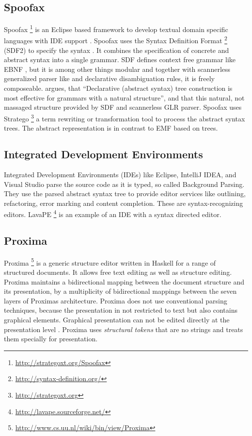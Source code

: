 \subsection{Spoofax}
Spoofax \footnote{\raggedright \url{http://strategoxt.org/Spoofax}} is an Eclipse based framework to develop textual domain specific languages with IDE support \cite{Spoofax}. Spoofax uses the Syntax Definition Format \footnote{\raggedright \url{http://syntax-definition.org/}} (SDF2) to specify the syntax \cite{Spoofax}. It combines the specification of concrete and abstract syntax into a single grammar. SDF defines context free grammar like EBNF \cite{sdf}, but it is among other things modular and together with scannerless generalized parser like \cite{sglr} and declarative disambiguation rules, it is freely composeable.  \cite{bible} argues, that ``Declarative (abstract syntax) tree construction is most effective for grammars with a natural structure'', and that this natural, not massaged structure provided by SDF and scannerless GLR parser. Spoofax uses Stratego \footnote{\raggedright \url{http://strategoxt.org}} a term rewriting or transformation tool \cite{stratego} to process the abstract syntax trees. The abstract representation is in contrast to EMF based on trees.


\subsection{Integrated Development Environments}
Integrated Development Environments (IDEs) like Eclipse, IntelliJ IDEA, and Visual Studio parse the source code as it is typed, so called Background Parsing. They use the parsed abstract syntax tree to provide editor services like outlining, refactoring, error marking and content completion. These are syntax-recognizing editors. LavaPE \footnote{\raggedright \url{http://lavape.sourceforge.net/}} is an example of an IDE with a syntax directed editor.  


\subsection{Proxima}
Proxima \footnote{\raggedright \url{http://www.cs.uu.nl/wiki/bin/view/Proxima}}  is a generic structure editor written in Haskell for a range of structured documents. It allows free text editing as well as structure editing. Proxima maintains a bidirectional mapping between the document structure and its presentation, by a multiplicity of bidirectional mappings between the seven layers of Proximas architecture. Proxima does not use conventional parsing techniques, because the presentation in not restricted to text but also contains graphical elements. Graphical presentation can not be edited directly at the presentation level \cite{beyond_ascii}. Proxima uses \emph{structural tokens} that are no strings and treats them specially \cite{proxima} for presentation.


